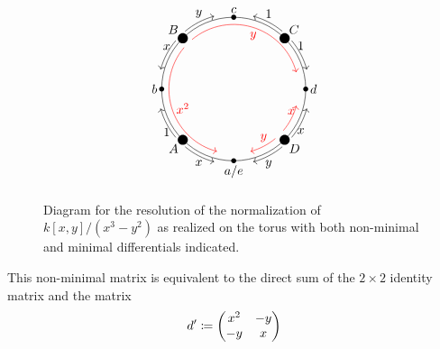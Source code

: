 \documentclass{amsart}
\begin{document}
\begin{example} 
\begin{figure}[h]
\[
\begin{tikzpicture}
\draw (0,0) circle (2cm);
\fill (270:2cm) circle (2pt) node [below] {$a/e$};
\fill (90:2cm) circle (2pt) node [above] {$c$};
\fill (180:2cm) circle (2pt) node [left] {$b$};
\fill (0:2cm) circle (2pt) node [right] {$d$};

\fill (45:2cm) circle (4pt) node [above right] {$C$};
\fill (135:2cm) circle (4pt) node [above left] {$B$};
\fill (225:2cm) circle (4pt) node [below left] {$A$};
\fill (315:2cm) circle (4pt) node [below right] {$D$};



\draw[->] (50:2.1cm)  arc[radius=2.1cm,start angle=50, delta angle = 25] node[above, midway] {$1$};
\draw[->] (40:2.1cm) arc[radius=2.1cm,start angle=40, delta angle = -25] node[above, midway] {$1$};

\draw[->] (140:2.1cm)  arc[radius=2.1cm,start angle=140, delta angle = 25] node[above, midway] {$x$};
\draw[->] (130:2.1cm) arc[radius=2.1cm,start angle=130, delta angle = -25] node[above, midway] {$y$};

\draw[->] (230:2.1cm)  arc[radius=2.1cm,start angle=230, delta angle = 25] node[below, midway] {$x$};
\draw[->] (220:2.1cm) arc[radius=2.1cm,start angle=220, delta angle = -25] node[below, midway] {$1$};

\draw[->] (320:2.1cm)  arc[radius=2.1cm,start angle=320, delta angle = 25] node[below, midway] {$x$};
\draw[->] (310:2.1cm) arc[radius=2.1cm,start angle=310, delta angle = -25] node[below, midway] {$y$};

\draw[->,red] (140:1.8cm) arc[radius=1.8cm,start angle = 140, delta angle = 115] node[right, midway] {$x^2$};
\draw[->,red] (130:1.8cm) arc[radius=1.8cm,start angle = 130, delta angle = -115] node[below, midway] {$y$};

\draw[->,red] (320:1.8cm) arc[radius=1.8cm,start angle = 320, delta angle = 25] node[above, midway] {$x$};
\draw[->,red] (310:1.8cm) arc[radius=1.8cm,start angle = 310, delta angle = -25] node[above, midway] {$y$};


\end{tikzpicture}
\]
\caption{Diagram for the resolution of the normalization of $k[x,y]/(x^3-y^2)$ as realized on the torus with both non-minimal and minimal differentials indicated.}
\label{fig:non-normal-hhl-examplex}
\end{figure}

This non-minimal matrix is equivalent to the direct sum of the
$2\times 2$ identity matrix and the matrix
$$
d'\coloneqq \begin{pmatrix}
x^2 &-y\\
-y&x
\end{pmatrix}
$$



\end{example}
\end{document}
